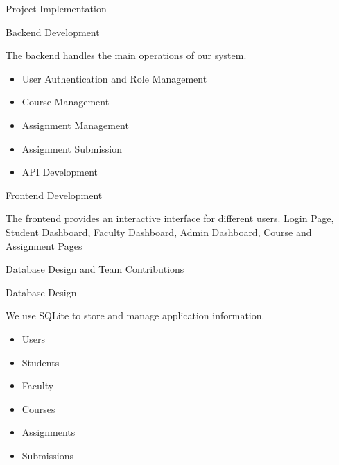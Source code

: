 \documentclass{beamer}
\begin{document}

\begin{frame}{Project Implementation}

\begin{block}{Backend Development}

The backend handles the main operations of our system.

\begin{itemize}

    \item User Authentication and Role Management
    \item Course Management
    \item Assignment Management
    \item Assignment Submission
    \item API Development

\end{itemize}



\end{block}

\begin{block}{Frontend Development}

The frontend provides an interactive interface
for different users.
Login Page,
     Student Dashboard,
     Faculty Dashboard,
     Admin Dashboard,
 Course and Assignment Pages


\end{block}

\end{frame}


\begin{frame}{Database Design and Team Contributions}

\begin{block}{Database Design}

We use SQLite to store and manage application information.

\begin{itemize}

    \item Users
    \item Students
    \item Faculty
    \item Courses
    \item Assignments
    \item Submissions

\end{itemize}

\end{block}




\end{frame}
\end{document}
